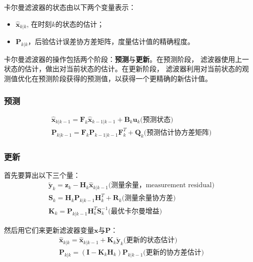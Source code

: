 卡尔曼滤波器的状态由以下两个变量表示：
\begin{itemize}
  \item $\hat{\bm{x}}_{k | k}$, 在时刻$k$的状态的估计；
  \item $\bm{P}_{k|k}$，后验估计误差协方差矩阵，度量估计值的精确程度。
\end{itemize}

卡尔曼滤波器的操作包括两个阶段：\textbf{预测}与\textbf{更新}。在预测阶段，
滤波器使用上一状态的估计，做出对当前状态的估计。在更新阶段，
滤波器利用对当前状态的观测值优化在预测阶段获得的预测值，以获得一个更精确的新估计值。
\subsubsection{预测}
\begin{equation}
  \begin{aligned}
    &\hat{\bm{x}}_{k|k-1}=\bm{F}_k \hat{\bm{x}}_{k-1 | k-1} + \bm{B}_k \bm{u}_{k} \text{(预测状态)} \\
    &\bm{P}_{k|k-1}=\bm{F}_k \bm{P}_{k-1|k-1} \bm{F}_k^T + \bm{Q}_k
    \text{(预测估计协方差矩阵)}
  \end{aligned}
\end{equation}

\subsubsection{更新}
首先要算出以下三个量：
\begin{equation}
  \begin{aligned}
    &\tilde{\bm{y}}_k = \bm{z}_k - \bm{H}_k \hat{\bm{x}}_{k|k-1}
     \text{(测量余量，measurement residual)} \\
    &\bm{S}_{k}=\bm{H}_k \bm{P}_{k|k-1} \bm{H}_k^T + \bm{R}_k
    \text{(测量余量协方差)} \\
    &\bm{K}_k = \bm{P}_{k|k-1} \bm{H}_k^T \bm{S}_{k}^{-1}
    \text{(最优卡尔曼增益)}
  \end{aligned}
\end{equation}

然后用它们来更新滤波器变量$\bm{x}$与$\bm{P}$：
\begin{equation}
  \begin{aligned}
    &\hat{\bm{x}}_{k|k} = \hat{\bm{x}}_{k|k-1} + \bm{K}_k \tilde{\bm{y}}_k
     \text{(更新的状态估计)} \\
    &\bm{P}_{k|k} =(\bm{I}-  \bm{K}_k \bm{H}_k) \bm{P}_{k|k-1}
    \text{(更新的协方差估计)}
  \end{aligned}
\end{equation}

